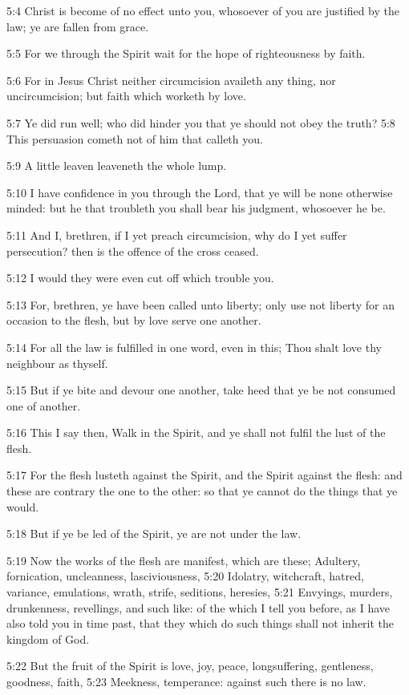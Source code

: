 5:4 Christ is become of no effect unto you, whosoever of you are justified by the law; ye are fallen from grace.

5:5 For we through the Spirit wait for the hope of righteousness by faith.

5:6 For in Jesus Christ neither circumcision availeth any thing, nor uncircumcision; but faith which worketh by love.

5:7 Ye did run well; who did hinder you that ye should not obey the truth?  5:8 This persuasion cometh not of him that calleth you.

5:9 A little leaven leaveneth the whole lump.

5:10 I have confidence in you through the Lord, that ye will be none otherwise minded: but he that troubleth you shall bear his judgment, whosoever he be.

5:11 And I, brethren, if I yet preach circumcision, why do I yet suffer persecution? then is the offence of the cross ceased.

5:12 I would they were even cut off which trouble you.

5:13 For, brethren, ye have been called unto liberty; only use not liberty for an occasion to the flesh, but by love serve one another.

5:14 For all the law is fulfilled in one word, even in this; Thou shalt love thy neighbour as thyself.

5:15 But if ye bite and devour one another, take heed that ye be not consumed one of another.

5:16 This I say then, Walk in the Spirit, and ye shall not fulfil the lust of the flesh.

5:17 For the flesh lusteth against the Spirit, and the Spirit against the flesh: and these are contrary the one to the other: so that ye cannot do the things that ye would.

5:18 But if ye be led of the Spirit, ye are not under the law.

5:19 Now the works of the flesh are manifest, which are these; Adultery, fornication, uncleanness, lasciviousness, 5:20 Idolatry, witchcraft, hatred, variance, emulations, wrath, strife, seditions, heresies, 5:21 Envyings, murders, drunkenness, revellings, and such like: of the which I tell you before, as I have also told you in time past, that they which do such things shall not inherit the kingdom of God.

5:22 But the fruit of the Spirit is love, joy, peace, longsuffering, gentleness, goodness, faith, 5:23 Meekness, temperance: against such there is no law.

